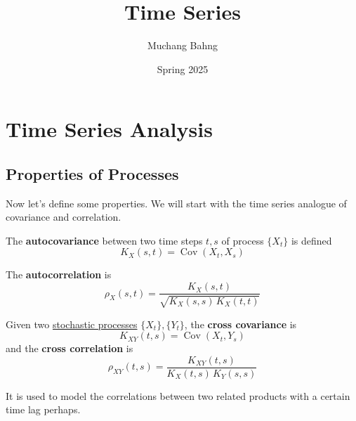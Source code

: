 \documentclass{article}
\DeclareMathOperator{\Cov}{Cov}
\begin{document}
\title{Time Series}
\author{Muchang Bahng}
\date{Spring 2025}

\maketitle
\tableofcontents
\pagebreak



\section{Time Series Analysis}

\subsection{Properties of Processes}

  Now let's define some properties. We will start with the time series analogue of covariance and correlation. 

  \begin{definition}[Autocovariance]
    \label{def:autocovariance}
    The \textbf{autocovariance} between two time steps $t, s$ of process $\{X_t\}$ is defined 
    \begin{equation}
      K_X (s, t) = \Cov(X_t, X_s)
    \end{equation}
  \end{definition}

  \begin{definition}[Autocorrelation]
    \label{def:autocorrelation}
    The \textbf{autocorrelation} is 
    \begin{equation}
      \rho_X (s, t) = \frac{K_X (s, t)}{\sqrt{K_X (s, s) \, K_X (t, t)}}
    \end{equation}
  \end{definition}

  \begin{definition}
    \label{def:cross-covariance}
    Given two \hyperref[sp-def:stochastic-process]{stochastic processes} $\{X_t\}, \{Y_t\}$, the \textbf{cross covariance} is 
    \begin{equation}
      K_{XY} (t, s) = \Cov(X_t, Y_s)
    \end{equation}
    and the \textbf{cross correlation} is 
    \begin{equation}
      \rho_{XY} (t, s) = \frac{K_{XY}(t, s)}{K_X (t, s) \, K_Y(s, s)}
    \end{equation}

    It is used to model the correlations between two related products with a certain time lag perhaps.  
  \end{definition}
\end{document}
